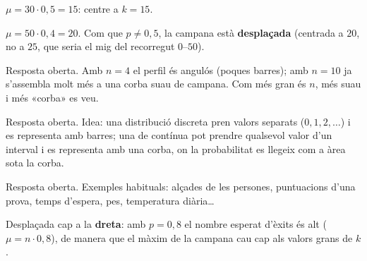 \begin{solucions}
\begin{sollist}
  \item $\mu=30\cdot 0,5=15$: centre a $k=15$.
  \item $\mu=50\cdot 0,4=20$. Com que $p\neq 0,5$, la campana està \textbf{desplaçada}
        (centrada a $20$, no a $25$, que seria el mig del recorregut $0$--$50$).
  \item Resposta oberta. Amb $n=4$ el perfil és angulós (poques barres); amb $n=10$ ja
        s'assembla molt més a una corba suau de campana. Com més gran és $n$, més suau i
        més «corba» es veu.
  \item Resposta oberta. Idea: una distribució discreta pren valors separats
        ($0,1,2,\dots$) i es representa amb barres; una de contínua pot prendre qualsevol
        valor d'un interval i es representa amb una corba, on la probabilitat es llegeix
        com a àrea sota la corba.
  \item Resposta oberta. Exemples habituals: alçades de les persones, puntuacions d'una
        prova, temps d'espera, pes, temperatura diària\ldots
  \item Desplaçada cap a la \textbf{dreta}: amb $p=0,8$ el nombre esperat d'èxits és alt
        ($\mu=n\cdot 0,8$), de manera que el màxim de la campana cau cap als valors grans
        de $k$.
\end{sollist}
\end{solucions}

